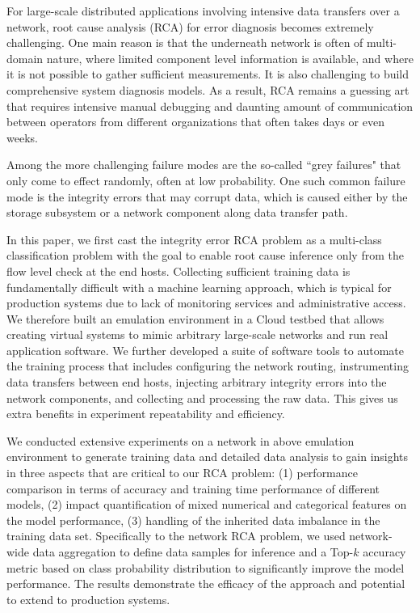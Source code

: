 For large-scale distributed applications involving intensive data transfers over a network, root cause analysis (RCA) for error diagnosis becomes extremely challenging. One main reason is that the underneath network is often of multi-domain nature, where limited component level information is available, and where it is not possible to gather sufficient measurements. It is also challenging to build comprehensive system diagnosis models. As a result, RCA remains a guessing art that requires intensive manual debugging and daunting amount of communication between operators from different organizations that often takes days or even weeks.  

Among the more challenging failure modes are the so-called ``grey failures" that only come to effect randomly, often at low probability. One such common failure mode is the integrity errors that may corrupt data, which is caused either by the storage subsystem or a network component along data transfer path. 

In this paper, we first cast the integrity error RCA problem as a multi-class classification problem with the goal to enable root cause inference only from the flow level check at the end hosts. Collecting sufficient training data is fundamentally difficult with a machine learning approach, which is typical for production systems due to lack of monitoring services and administrative access. We therefore built an emulation environment in a Cloud testbed that allows creating virtual systems to mimic arbitrary large-scale networks and run real application software. We further developed a suite of software tools to automate the training process that includes configuring the network routing, instrumenting data transfers between end hosts, injecting arbitrary integrity errors into the network components, and collecting and processing the raw data. This gives us extra benefits in experiment repeatability and efficiency. 

We conducted extensive experiments on a network in above emulation environment to generate training data and detailed data analysis to gain insights in three aspects that are critical to our RCA 
problem: (1) performance comparison in terms of accuracy and training time performance of different models, (2) impact quantification of mixed numerical and categorical features on the model performance, 
(3) handling of the inherited data imbalance in the training data set. Specifically to the network RCA problem, we used network-wide data aggregation to define data samples for inference and a Top-$k$ accuracy 
metric based on class probability distribution to significantly improve the model performance. The results demonstrate the efficacy of the approach and potential to extend to production systems.  
